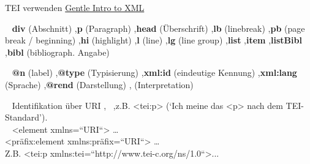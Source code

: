 \begin{frame}{TEI verwenden}
\footnotesize
\href{http://www.tei-c.org/release/doc/tei-p5-doc/en/html/SG.html}{Gentle Intro to XML}

~ \textbf{div} (Abschnitt) \sep \textbf{p} (Paragraph) \sep \textbf{head} (Überschrift) \sep \textbf{lb} (linebreak) \sep \textbf{pb} (page break / beginning) \sep \textbf{hi} (highlight) \sep \textbf{l} (line) \sep \textbf{lg} (line group) \sep \textbf{list} \sep \textbf{item} \sep \textbf{listBibl} \sep \textbf{bibl} (bibliograph. Angabe)

~ \textbf{@n} (label) \sep \textbf{@type} (Typisierung) \sep \textbf{xml:id} (eindeutige Kennung) \sep \textbf{xml:lang} (Sprache) \sep \textbf{@rend} (Darstellung) \sep {} (Interpretation)


~ Identifikation über URI \sep {}~ \sep z.B. <tei:p> (`Ich meine das <p> nach dem TEI-Standard'). \\
~ <element xmlns=“URI“> \dots \\
<präfix:element xmlns:präfix=“URI“> \dots \\
Z.B. <tei:p xmlns:tei=“http://www.tei-c.org/ns/1.0“>...


\end{frame}



